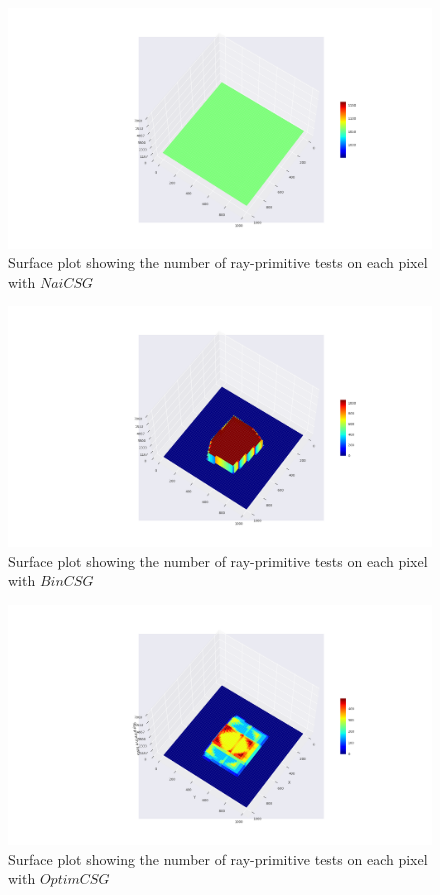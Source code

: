 \documentclass[a4paper,11pt,oneside]{article}
\begin{document}
\begin{figure}[H]
	\centering
	\includegraphics[width=\textwidth]{section5/plots/surface_naive_union.png}
	\caption{Surface plot showing the number of ray-primitive tests on each pixel with $NaiCSG$}
	\label{sec5.1:test_count_naive}
\end{figure}

\begin{figure}[H]
	\centering
	\includegraphics[width=\textwidth]{section5/plots/surface_bin_union.png}
	\caption{Surface plot showing the number of ray-primitive tests on each pixel with $BinCSG$}
	\label{sec5.1:test_count_bin}
\end{figure}

\begin{figure}[H]
	\centering
	\includegraphics[width=\textwidth]{section5/plots/surface_optim_union.png}
	\caption{Surface plot showing the number of ray-primitive tests on each pixel with $OptimCSG$}
	\label{sec5.1:test_count_optim}
\end{figure}
\end{document}
